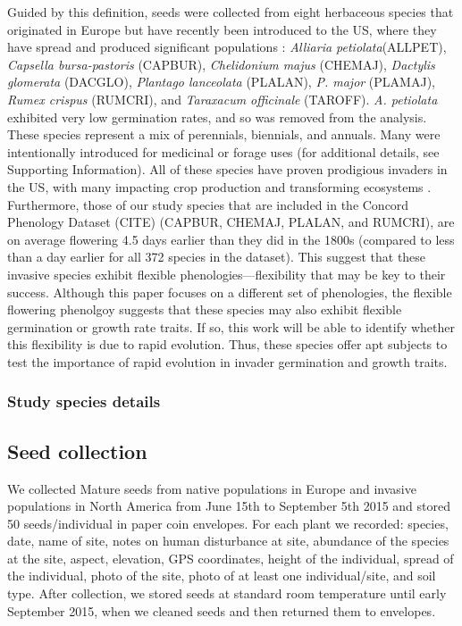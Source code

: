 \documentclass[12pt]{article}\usepackage[]{graphicx}\usepackage[]{color}
\begin{document}
	Guided by this definition, seeds were collected from eight herbaceous species that originated in Europe but have recently been introduced to the US, where they have spread and produced significant populations \parencite{Uva1997}:\textit{ Alliaria petiolata}(ALLPET), \textit{Capsella bursa-pastoris} (CAPBUR), \textit{Chelidonium majus} (CHEMAJ), \textit{Dactylis glomerata} (DACGLO),  \textit{Plantago lanceolata} (PLALAN), \textit{P.  major} (PLAMAJ), \textit{Rumex crispus} (RUMCRI), and \textit{Taraxacum officinale} (TAROFF). \textit{A. petiolata} exhibited very low germination rates, and so was removed from the analysis. These species represent a mix of perennials, biennials, and annuals. Many were intentionally introduced for medicinal or forage uses (for additional details, see Supporting Information).  All of these species have proven prodigious invaders in the US, with many impacting crop production and transforming ecosystems \parencite[e.g.,][]{Froese2003,Wolfe2008}. Furthermore, those of our study species that are included in the Concord Phenology Dataset (CITE) (CAPBUR, CHEMAJ, PLALAN, and RUMCRI), are on average flowering 4.5 days earlier than they did in the 1800s (compared to less than a day earlier for all 372 species in the dataset). This suggest that these invasive species exhibit flexible phenologies---flexibility that may be key to their success. Although this paper focuses on a different set of phenologies, the flexible flowering phenolgoy suggests that these species may also exhibit flexible germination or growth rate traits. If so, this work will be able to identify whether this flexibility is due to rapid evolution. Thus, these species offer apt subjects to test the importance of rapid evolution in invader germination and growth traits. 

	\subsubsection{Study species details} 
	
	
	\subsection{Seed collection} 
	We collected Mature seeds from native populations in Europe and invasive populations in North America from June 15th to September 5th 2015 and stored 50 seeds/individual in paper coin envelopes. For each plant we recorded: species, date, name of site, notes on human disturbance at site, abundance of the species at the site, aspect, elevation, GPS coordinates, height of the individual, spread of the individual, photo of the site, photo of at least one individual/site, and soil type. After collection, we stored seeds at standard room temperature until early September 2015, when we cleaned seeds and then returned them to envelopes. 
\end{document}
